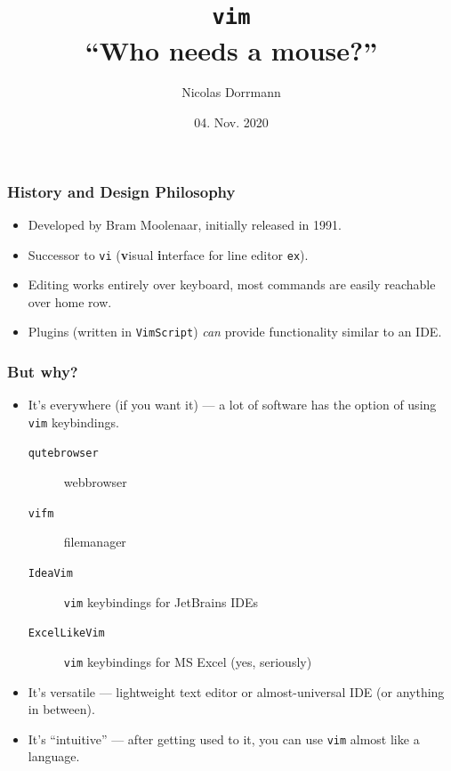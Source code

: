 \documentclass{beamer}
\title{\Huge\texttt{vim} \\ \normalsize ``Who needs a mouse?''}
\author{Nicolas Dorrmann}
\date{04. Nov. 2020}
\begin{document}
\frame{\titlepage}

\begin{frame}
    \frametitle{History and Design Philosophy}
    \begin{itemize}
        \item Developed by Bram Moolenaar, initially released in 1991.
        \item Successor to \texttt{vi} (\textbf{v}isual \textbf{i}nterface for line editor \texttt{ex}).
        \item Editing works entirely over keyboard, most commands are easily reachable over home row.
        \item Plugins (written in \texttt{VimScript}) \textit{can} provide functionality similar to an IDE.
    \end{itemize}
\end{frame}
\begin{frame}
    \frametitle{But why?}
    \begin{itemize}
        \item It's everywhere (if you want it) --- a lot of software has the option of using \texttt{vim} keybindings.
        \begin{description}
            \item [\texttt{qutebrowser}]  webbrowser
            \item [\texttt{vifm}]         filemanager
            \item [\texttt{IdeaVim}]      \texttt{vim} keybindings for JetBrains IDEs
            \item [\texttt{ExcelLikeVim}] \texttt{vim} keybindings for MS Excel (yes, seriously)
        \end{description}
        \item It's versatile --- lightweight text editor or almost-universal IDE (or anything in between).
        \item It's ``intuitive'' --- after getting used to it, you can use \texttt{vim} almost like a language.
    \end{itemize}
\end{frame}
\end{document}

